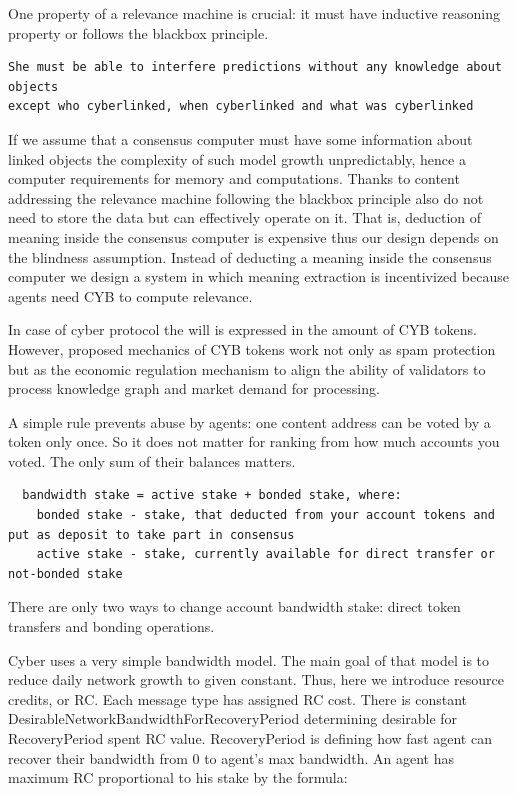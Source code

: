 \documentclass[8pt,oneside]{amsart}
\newcommand{\code}[1]{{\PlayBold #1}}
\begin{document}
One property of a relevance machine is crucial: it must have inductive reasoning property or follows the blackbox principle.

\begin{lstlisting}
She must be able to interfere predictions without any knowledge about objects
except who cyberlinked, when cyberlinked and what was cyberlinked
\end{lstlisting}

If we assume that a consensus computer must have some information about linked objects the complexity of such model growth unpredictably, hence a computer requirements for memory and computations. Thanks to content addressing the relevance machine following the blackbox principle also do not need to store the data but can effectively operate on it. That is, deduction of meaning inside the consensus computer is expensive thus our design depends on the blindness assumption. Instead of deducting a meaning inside the consensus computer we design a system in which meaning extraction is incentivized because agents need CYB to compute relevance.

In case of cyber protocol the will is expressed in the amount of CYB tokens. However, proposed mechanics of CYB tokens work not only as spam protection but as the economic regulation mechanism to align the ability of validators to process knowledge graph and market demand for processing.

A simple rule prevents abuse by agents: one content address can be voted by a token only once. So it does not matter for ranking from how much accounts you voted. The only sum of their balances matters.

\begin{lstlisting}
  bandwidth stake = active stake + bonded stake, where:
    bonded stake - stake, that deducted from your account tokens and put as deposit to take part in consensus
    active stake - stake, currently available for direct transfer or not-bonded stake
\end{lstlisting}

There are only two ways to change account bandwidth stake: direct token transfers and bonding operations.

Cyber uses a very simple bandwidth model. The main goal of that model is to reduce daily network growth to given constant. Thus, here we introduce \code{resource credits}, or RC. Each message type has assigned RC cost. There is constant \code{DesirableNetworkBandwidthForRecoveryPeriod} determining desirable for \code{RecoveryPeriod} spent RC value. \code{RecoveryPeriod} is defining how fast agent can recover their bandwidth from 0 to agent's max bandwidth. An agent has maximum RC proportional to his stake by the formula:
\end{document}
